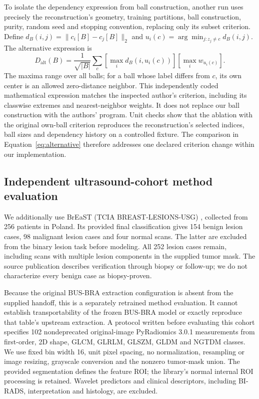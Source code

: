 \documentclass[11pt,a4paper]{article}
\begin{document}
To isolate the dependency expression from ball construction, another run uses precisely the reconstruction's geometry, training partitions, ball construction, purity, random seed and stopping convention, replacing only its subset criterion. Define $d_B(i,j)=\|c_i[B]-c_j[B]\|_2$ and $u_i(c)=\arg\min_{j:z_j\ne c}d_B(i,j)$. The alternative expression is
\begin{equation}\label{eq:alternative}
 D_{\mathrm{alt}}(B)=\frac{1}{\sqrt{|B|}}\sum_c
 \left[\max_i d_B(i,u_i(c))\right]
 \left[\max_i w_{u_i(c)}\right].
\end{equation}
The maxima range over all balls; for a ball whose label differs from $c$, its own center is an allowed zero-distance neighbor. This independently coded mathematical expression matches the inspected author's criterion, including its classwise extremes and nearest-neighbor weights. It does not replace our ball construction with the authors' program. Unit checks show that the ablation with the original own-ball criterion reproduces the reconstruction's selected indices, ball sizes and dependency history on a controlled fixture. The comparison in Equation~\ref{eq:alternative} therefore addresses one declared criterion change within our implementation.

\subsection{Independent ultrasound-cohort method evaluation}\label{sec:breast}
We additionally use BrEaST (TCIA BREAST-LESIONS-USG) \cite{breast}, collected from 256 patients in Poland. Its provided final classification gives 154 benign lesion cases, 98 malignant lesion cases and four normal scans. The latter are excluded from the binary lesion task before modeling. All 252 lesion cases remain, including scans with multiple lesion components in the supplied tumor mask. The source publication describes verification through biopsy or follow-up; we do not characterize every benign case as biopsy-proven.

Because the original BUS-BRA extraction configuration is absent from the supplied handoff, this is a separately retrained method evaluation. It cannot establish transportability of the frozen BUS-BRA model or exactly reproduce that table's upstream extraction. A protocol written before evaluating this cohort specifies 102 nondeprecated original-image PyRadiomics 3.0.1 measurements from first-order, 2D shape, GLCM, GLRLM, GLSZM, GLDM and NGTDM classes. We use fixed bin width 16, unit pixel spacing, no normalization, resampling or image resizing, grayscale conversion and the nonzero tumor-mask union. The provided segmentation defines the feature ROI; the library's normal internal ROI processing is retained. Wavelet predictors and clinical descriptors, including BI-RADS, interpretation and histology, are excluded.
\end{document}
